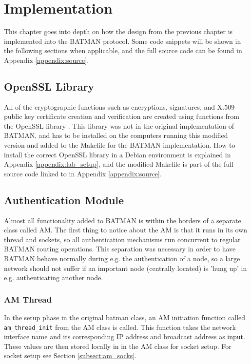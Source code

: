 \chapter{Implementation}
\label{ch:implementation}
\acresetall

This chapter goes into depth on how the design from the previous chapter is
implemented into the BATMAN protocol. Some code snippets will be shown in the
following sections when applicable, and the full source code can be found in
Appendix \ref{appendix:source}.

\section{OpenSSL Library}
All of the cryptographic functions such as encryptions, signatures, and X.509
public key certificate creation and verification are created using functions
from the OpenSSL library \cite{viega2002network}. This library was not in the
original implementation of BATMAN, and has to be installed on the computers running this modified version
and added to the Makefile for the BATMAN implementation. How to install the
correct OpenSSL library in a Debian environment is explained in Appendix
\ref{appendix:lab_setup}, and the modified Makefile is part of the full source
code linked to in Appendix \ref{appendix:source}.

\section{Authentication Module}
Almost all functionality added to BATMAN is within the borders of a separate
class called \ac{AM}. The first thing to notice about the \ac{AM} is that it
runs in its own thread and sockets, so all authentication mechanisms run
concurrent to regular BATMAN routing operations. This separation was necessary
in order to have BATMAN behave normally during e.g. the authentication of a
node, so a large network should not suffer if an important node (centrally
located) is 'hung up' in e.g. authenticating another node.

\subsection{AM Thread}
In the setup phase in the original batman class, an \ac{AM} initiation function
called \texttt{am\_thread\_init} from the \ac{AM} class is called. This
function takes the network interface name and its corresponding IP address and broadcast
address as input. These values are then stored locally in in the AM class for
socket setup. For socket setup see Section \ref{subsect:am_socks}.

